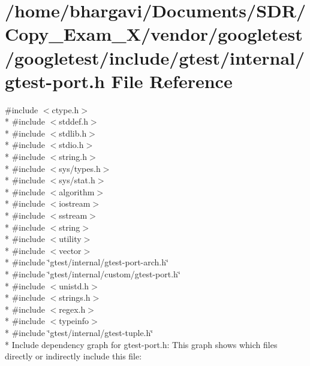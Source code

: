 \hypertarget{gtest-port_8h}{}\section{/home/bhargavi/\+Documents/\+S\+D\+R/\+Copy\+\_\+\+Exam\+\_\+X/vendor/googletest/googletest/include/gtest/internal/gtest-\/port.h File Reference}
\label{gtest-port_8h}
{\ttfamily \#include $<$ctype.\+h$>$}\\*
{\ttfamily \#include $<$stddef.\+h$>$}\\*
{\ttfamily \#include $<$stdlib.\+h$>$}\\*
{\ttfamily \#include $<$stdio.\+h$>$}\\*
{\ttfamily \#include $<$string.\+h$>$}\\*
{\ttfamily \#include $<$sys/types.\+h$>$}\\*
{\ttfamily \#include $<$sys/stat.\+h$>$}\\*
{\ttfamily \#include $<$algorithm$>$}\\*
{\ttfamily \#include $<$iostream$>$}\\*
{\ttfamily \#include $<$sstream$>$}\\*
{\ttfamily \#include $<$string$>$}\\*
{\ttfamily \#include $<$utility$>$}\\*
{\ttfamily \#include $<$vector$>$}\\*
{\ttfamily \#include \char`\"{}gtest/internal/gtest-\/port-\/arch.\+h\char`\"{}}\\*
{\ttfamily \#include \char`\"{}gtest/internal/custom/gtest-\/port.\+h\char`\"{}}\\*
{\ttfamily \#include $<$unistd.\+h$>$}\\*
{\ttfamily \#include $<$strings.\+h$>$}\\*
{\ttfamily \#include $<$regex.\+h$>$}\\*
{\ttfamily \#include $<$typeinfo$>$}\\*
{\ttfamily \#include \char`\"{}gtest/internal/gtest-\/tuple.\+h\char`\"{}}\\*
Include dependency graph for gtest-\/port.h\+:
This graph shows which files directly or indirectly include this file\+:
